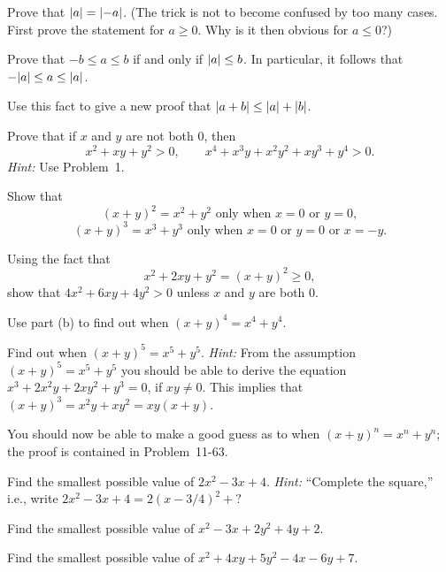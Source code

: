 \begin{letters}
\item Prove that $\lvert a\rvert = \lvert-a\rvert$. (The trick is not to become confused
  by too many cases. First prove the statement for $a \geq 0$. Why is it then
  obvious for $a \leq 0$?)
\item Prove that $-b \leq a \leq b$ if and only if $\lvert a\rvert \leq b$. In
  particular, it follows that $-\lvert a\rvert \leq a \leq \lvert a\rvert$.
\item Use this fact to give a new proof that $\lvert a+b\rvert \leq \lvert a\rvert+\lvert b\rvert$.
\end{letters}

 Prove that if $x$ and $y$ are not both $0$, then
\[
x^2 + xy + y^2 > 0,
\qquad
x^4 + x^3y + x^2y^2 + xy^3 + y^4 > 0.
\]
\textit{Hint:} Use Problem~1.

\begin{letters}
\item Show that
\[
(x+y)^2 = x^2 + y^2 \text{ only when } x = 0 \text{ or } y = 0,
\]
\[
(x+y)^3 = x^3 + y^3 \text{ only when } x = 0 \text{ or } y = 0 \text{ or }
x = -y.
\]
\item Using the fact that
\[ x^2 + 2xy + y^2 = (x+y)^2 \geq 0, \]
show that $4x^2 + 6xy + 4y^2 > 0$ unless $x$ and $y$ are both $0$.
\item Use part (b) to find out when $(x+y)^4 = x^4 + y^4$.
\item Find out when $(x+y)^5 = x^5 + y^5$. \textit{Hint:} From the assumption
  $(x+y)^5 = x^5 + y^5$ you should be able to derive the equation
  $x^3 + 2x^2y + 2xy^2 + y^3 = 0$, if $xy \neq 0$. This implies that
  $(x+y)^3 = x^2y + xy^2 = xy(x+y)$.
\end{letters}
You should now be able to make a good guess as to when $(x+y)^n = x^n + y^n$;
the proof is contained in Problem~11-63.

\begin{letters}
\item Find the smallest possible value of $2x^2 - 3x + 4$. \textit{Hint:}
  ``Complete the square,'' i.e., write $2x^2 - 3x + 4 = 2(x - 3/4)^2 + \text{?}$
\item Find the smallest possible value of $x^2 - 3x + 2y^2 + 4y + 2$.
\item Find the smallest possible value of $x^2 + 4xy + 5y^2 - 4x - 6y + 7$.
\end{letters}


